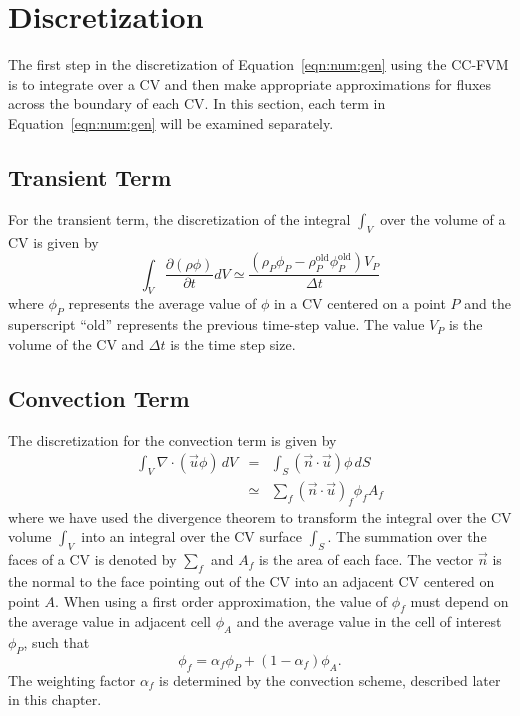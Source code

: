 \section{Discretization}

The first step in the discretization of Equation~\eqref{eqn:num:gen}
using the CC-FVM is to integrate over a CV and then make appropriate
approximations for fluxes across the boundary of each CV.  In this
section, each term in Equation~\eqref{eqn:num:gen} will be examined
separately.

\subsection{Transient Term}

For the transient term, the discretization of the integral \( \int_V
\) over the volume of a CV is given by
\begin{equation}
\int_V \frac{\partial (\rho \phi)}{\partial t} dV
\simeq
\frac{(\rho_{P} \phi_{P} - \rho_{P}^\text{old} \phi_{P}^\text{old}) V_P}{\Delta t}
\label{eqn:num:tra}
\end{equation}
where \( \phi_P \) represents the average value of \( \phi \) in a CV
centered on a point \( P \) and the superscript ``$\text{old}$''
represents the previous time-step value.  The value $V_P$ is the
volume of the CV and $\Delta t$ is the time step size.

\subsection{Convection Term}

The discretization for the convection term is given by
\begin{eqnarray}
\int_V \nabla \cdot (\vec{u} \phi)\,dV & = & 
\int_S (\vec{n} \cdot \vec{u})\phi\,dS \\
& \simeq & \sum_{f} (\vec{n} \cdot \vec{u})_f \phi_f A_f
\label{eqn:num:con}
\end{eqnarray}
where we have used the divergence theorem to transform the integral
over the CV volume \( \int_V \) into an integral over the CV surface
\( \int_S \).  The summation over the faces of a CV is denoted by
$\sum_{f}$ and $A_f$ is the area of each face.  The vector $\vec{n}$
is the normal to the face pointing out of the CV into an adjacent CV
centered on point \( A \).  When using a first order approximation,
the value of $\phi_f$ must depend on the average value in adjacent
cell $\phi_A$ and the average value in the cell of interest $\phi_P$,
such that
\begin{equation}
\phi_f=\alpha_f \phi_P +(1-\alpha_f)\phi_A.
\end{equation}
The weighting factor $\alpha_f$ is determined by the convection
scheme, described later in this chapter.

